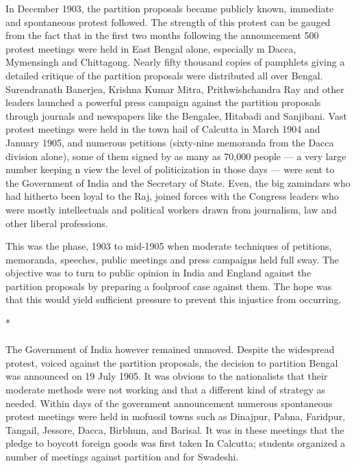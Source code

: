In December 1903, the partition proposals became publicly known, immediate and spontaneous protest followed. The strength of this protest can be gauged from the fact that in the first two months following the announcement 500 protest meetings were held in East Bengal alone, especially m Dacca, Mymensingh and Chittagong. Nearly fifty thousand copies of pamphlets giving a detailed critique of the partition proposals were distributed all over Bengal. Surendranath Banerjea, Krishna Kumar Mitra, Prithwishchandra Ray and other leaders launched a powerful press campaign against the partition proposals through journals and newspapers like the Bengalee, Hitabadi and Sanjibani. Vast protest meetings were held in the town hail of Calcutta in March 1904 and January 1905, and numerous petitions (sixty-nine memoranda from the Dacca division alone), some of them signed by as many as 70,000 people — a very large number keeping n view the level of politicization in those days — were sent to the Government of India and the Secretary of State. Even, the big zamindars who had hitherto been loyal to the Raj, joined forces with the Congress leaders who were mostly intellectuals and political workers drawn from journalism, law and other liberal professions.

This was the phase, 1903 to mid-1905 when moderate techniques of petitions, memoranda, speeches, public meetings and press campaigns held full sway. The objective was to turn to public opinion in India and England against the partition proposals by preparing a foolproof case against them. The hope was that this would yield sufficient pressure to prevent this injustice from occurring.

\begin{center}*\end{center}

\paragraph*{}


The Government of India however remained unmoved. Despite the widespread protest, voiced against the partition proposals, the decision to partition Bengal was announced on 19 July 1905. It was obvious to the nationalists that their moderate methods were not working and that a different kind of strategy as needed. Within days of the government announcement numerous spontaneous protest meetings were held in mofussil towns such as Dinajpur, Pabna, Faridpur, Tangail, Jessore, Dacca, Birbhum, and Barisal. It was in these meetings that the pledge to boycott foreign goods was first taken In Calcutta; students organized a number of meetings against partition and for Swadeshi.

